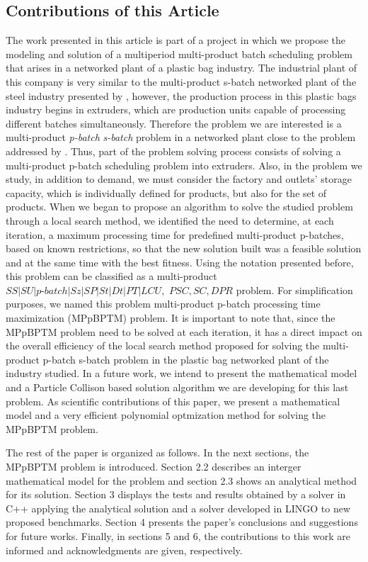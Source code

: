 \documentclass[10pt,fleqn,a4paper,twoside]{article}
\begin{document}
\subsection{Contributions of this Article}

The work presented in this article is part of a project in which we propose the modeling and solution of a multiperiod multi-product batch scheduling problem that arises in a networked plant of a plastic bag industry. The industrial plant of this company is very similar to the multi-product s-batch networked plant of the steel industry presented by \cite{LiuEtAl2020}, however, the production process in this plastic bags industry begins in extruders, which are production units capable of processing different batches simultaneously. Therefore the problem we are interested is a multi-product \emph{p-batch} \emph{s-batch} problem in a networked plant close to the problem addressed by \cite{LiEtAl2022}. Thus, part of the problem solving process consists of solving a multi-product p-batch scheduling problem into extruders. Also, in the problem we study, in addition to demand, we must consider the factory and outlets' storage capacity, which is individually defined for products, but also for the set of products. When we began to propose an algorithm to solve the studied problem through a local search method, we identified the need to determine, at each iteration, a maximum processing time for predefined multi-product p-batches, based on known restrictions, so that the new solution built was a feasible solution and at the same time with the best fitness. Using the notation presented before, this problem can be classified as a multi-product $SS|SU|p\textrm{-}batch|Sz|SP|St|Dt|PT|LCU,$ $PSC, SC, DPR$ problem. For simplification purposes, we named this problem multi-product p-batch processing time maximization (MPpBPTM) problem. It is important to note that, since the MPpBPTM problem need to be solved at each iteration, it has a direct impact on the overall efficiency of the local search method proposed for solving the multi-product p-batch s-batch problem in the plastic bag networked plant of the industry studied. In a future work, we intend to present the mathematical model and a Particle Collison based solution algorithm we are developing for this last problem. As scientific contributions of this paper, we present a mathematical model and a very efficient polynomial optmization method for solving the MPpBPTM problem.

The rest of the paper is organized as follows. In the next sections, the MPpBPTM problem is introduced. Section 2.2 describes an interger mathematical model for the problem and section 2.3 shows an analytical method for its solution. Section 3 displays the tests and results obtained by a solver in C++ applying the analytical solution and a solver developed in LINGO to new proposed benchmarks. Section 4 presents the paper's conclusions and suggestions for future works. Finally, in sections 5 and 6, the contributions to this work are informed and acknowledgments are given, respectively.
\end{document}
